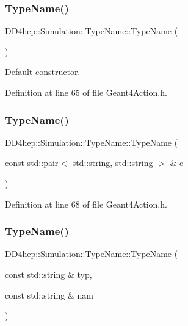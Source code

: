 \subsubsection{\texorpdfstring{Type\+Name()}{TypeName()}\hspace{0.1cm}{\footnotesize\ttfamily [1/3]}}
{\footnotesize\ttfamily D\+D4hep\+::\+Simulation\+::\+Type\+Name\+::\+Type\+Name (\begin{DoxyParamCaption}{ }\end{DoxyParamCaption})\hspace{0.3cm}{\ttfamily [inline]}}



Default constructor. 



Definition at line 65 of file Geant4\+Action.\+h.

\hypertarget{class_d_d4hep_1_1_simulation_1_1_type_name_ad33e6295683ae918b2ea2daad18b7917}{}\label{class_d_d4hep_1_1_simulation_1_1_type_name_ad33e6295683ae918b2ea2daad18b7917} 
\subsubsection{\texorpdfstring{Type\+Name()}{TypeName()}\hspace{0.1cm}{\footnotesize\ttfamily [2/3]}}
{\footnotesize\ttfamily D\+D4hep\+::\+Simulation\+::\+Type\+Name\+::\+Type\+Name (\begin{DoxyParamCaption}\item[{const std\+::pair$<$ std\+::string, std\+::string $>$ \&}]{c }\end{DoxyParamCaption})\hspace{0.3cm}{\ttfamily [inline]}}



Definition at line 68 of file Geant4\+Action.\+h.

\hypertarget{class_d_d4hep_1_1_simulation_1_1_type_name_a2d20b1a7a7d29a660d2fb3a7f471a78d}{}\label{class_d_d4hep_1_1_simulation_1_1_type_name_a2d20b1a7a7d29a660d2fb3a7f471a78d} 
\subsubsection{\texorpdfstring{Type\+Name()}{TypeName()}\hspace{0.1cm}{\footnotesize\ttfamily [3/3]}}
{\footnotesize\ttfamily D\+D4hep\+::\+Simulation\+::\+Type\+Name\+::\+Type\+Name (\begin{DoxyParamCaption}\item[{const std\+::string \&}]{typ,  }\item[{const std\+::string \&}]{nam }\end{DoxyParamCaption})\hspace{0.3cm}{\ttfamily [inline]}}



